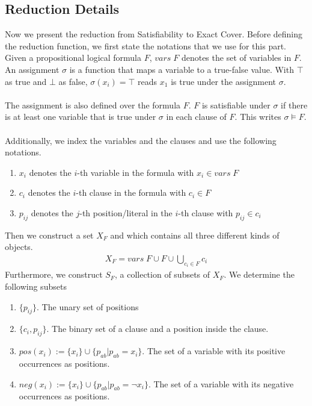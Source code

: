 \subsection{Reduction Details}
Now we present the reduction from Satisfiability to Exact Cover. 
Before defining the reduction function, we first state the notations that we use for this part. 
Given a propositional logical formula $F$, $vars\; F$ denotes the set of variables in $F$. 
An assignment $\sigma$ is a function that maps a variable to a true-false value. 
With $\top$ as true and $\bot$ as false, $\sigma(x_i) = \top$ reads $x_1$ is true under the assignment $\sigma$. \\\\
The assignment is also defined over the formula $F$. 
$F$ is satisfiable under $\sigma$ if there is at least one variable that is true under $\sigma$ in each clause of $F$. 
This writes $\sigma \models F$. \\\\
Additionally, we index the variables and the clauses and use the following notations.
\begin{enumerate}
    \item $x_i$ denotes the $i$-th variable in the formula with $x_i \in vars\; F$
    \item $c_i$ denotes the $i$-th clause in the formula with $c_i \in F$
    \item $p_{ij}$ denotes the $j$-th position/literal in the $i$-th clause with $p_{ij} \in c_i$
\end{enumerate} 
Then we construct a set $X_F$ and which contains all three different kinds of objects. 
\begin{align*}
    X_F = vars\; F \cup F \cup \bigcup_{c_i \in F} c_i
\end{align*}
Furthermore, we construct $S_F$, a collection of subsets of $X_F$. We determine the following subsets
\begin{enumerate}
    \item $\{p_{ij}\}$. The unary set of positions
    \item $\{c_i, p_{ij}\}$. The binary set of a clause and a position inside the clause.
    \item $pos(x_i) := \{x_i\} \cup \{p_{ab} | p_{ab} = x_i\}$. The set of a variable with its positive occurrences as positions.
    \item $neg(x_i):= \{x_i\} \cup \{p_{ab} | p_{ab} = \neg x_i\}$. The set of a variable with  its negative occurrences as positions.
\end{enumerate}
